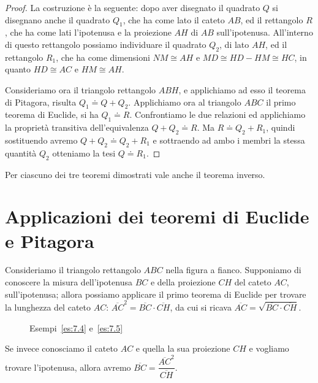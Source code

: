 \noindent\begin{minipage}{0.6\textwidth}\parindent15pt
\begin{proof}

La costruzione è la seguente: dopo aver disegnato il quadrato $Q$ si 
disegnano anche il quadrato $Q_1$, che ha come lato il cateto $AB$, 
ed il rettangolo $R$, che ha come lati l'ipotenusa e la proiezione 
$AH$ di $AB$ sull'ipotenusa. All'interno di questo rettangolo 
possiamo individuare il quadrato $Q_2$, di lato $AH$, ed il rettangolo 
$R_1$, che ha come dimensioni $NM\cong AH$ e $MD\cong HD-HM\cong HC$, 
in quanto $HD\cong AC$ e $HM\cong AH$.

Consideriamo ora il triangolo rettangolo $ABH$, e applichiamo ad esso 
il teorema di Pitagora, risulta $Q_1\doteq Q+Q_2$. Applichiamo ora al 
triangolo $ABC$ il primo teorema di Euclide, si ha $Q_1\doteq R$. 
Confrontiamo le due relazioni ed applichiamo la proprietà transitiva 
dell'equivalenza $Q+Q_2\doteq R$. Ma $R\doteq Q_2 + R_1$, quindi 
sostituendo avremo $Q+Q_2\doteq Q_2 + R_1$ e sottraendo ad ambo i 
membri la stessa quantità $Q_2$ otteniamo la tesi $Q\doteq R_1$.
\end{proof}
\end{minipage}\hfil
\begin{minipage}{0.4\textwidth}
  \centering
\end{minipage}\vspace{8pt}

Per ciascuno dei tre teoremi dimostrati vale anche il teorema inverso.


\section{Applicazioni dei teoremi di Euclide e Pitagora}
\label{sect:applicazioni_pitagora_euclide}

Consideriamo il triangolo rettangolo $ABC$ nella figura a fianco.
Supponiamo di conoscere la misura dell'ipotenusa $BC$ e della 
proiezione $CH$ del cateto $AC$, sull'ipotenusa; allora possiamo 
applicare il primo teorema di Euclide per trovare la lunghezza del 
cateto $AC$: $\overline{AC}^2=\overline{BC}\cdot \overline{CH}$, da 
cui si ricava $\overline{AC}=\sqrt{\overline{BC}\cdot \overline{CH}}$.

\begin{wrapfigure}{r}{0.25\textwidth}
  \centering
  \caption{Esempi~\ref{es:7.4} e~\ref{es:7.5}}\label{fig:es7.4}
\end{wrapfigure}
Se invece conosciamo il cateto $AC$ e quella la sua 
proiezione $CH$ e vogliamo trovare l'ipotenusa, allora avremo 
$\overline{BC}=\dfrac{\overline{AC}^2}{\overline{CH}}$.

